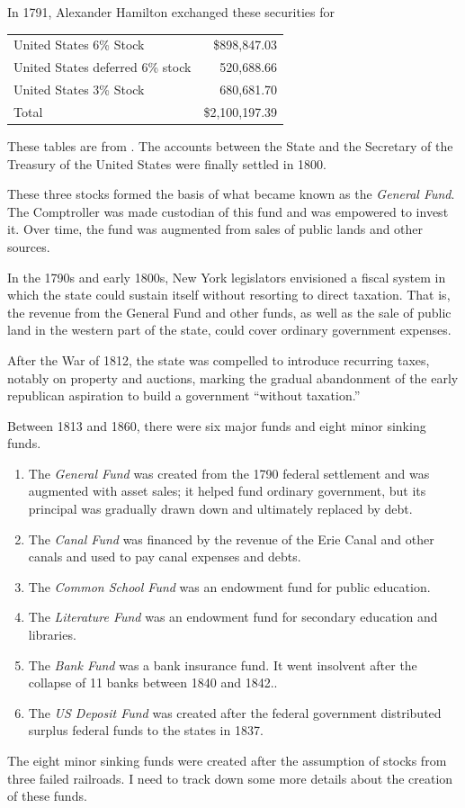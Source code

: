 \documentclass[11pt]{article}
\begin{document}
\noindent In 1791, Alexander Hamilton exchanged these securities for
\begin{center}
\begin{tabular}{lr}
United States 6\% Stock             & \$898,847.03 \\
United States deferred 6\% stock    & 520,688.66 \\
United States 3\% Stock             & 680,681.70 \\
\hline
Total                               &  \$2,100,197.39
\end{tabular}
\end{center}
These tables are from \citet[pages 255-6]{Sowers_1914}.  The accounts between 
the State and the Secretary of the Treasury of the United States were finally settled 
in 1800.  

These three stocks formed the basis of what became known as the \textit{General Fund}.  
The Comptroller was made custodian of this fund and was empowered to invest it.  
Over time, the fund was augmented from sales of public lands and other sources.  

In the 1790s and early 1800s, New York legislators envisioned a fiscal system 
in which the state could sustain itself without resorting to direct taxation.  
That is, the revenue from the General Fund and other funds, as well as the 
sale of public land in the western part of the state, could cover ordinary 
government expenses. 

After the War of 1812, the state was compelled to introduce 
recurring taxes, notably on property and auctions, marking the gradual 
abandonment of the early republican aspiration to build a government ``without 
taxation.''

Between 1813 and 1860, there were six major funds and eight minor sinking funds.  
\begin{enumerate}
\item The \textit{General Fund} was created from the 1790 federal settlement and was augmented with asset sales; it helped fund ordinary government, 
but its principal was gradually drawn down and ultimately replaced by debt. 
\item The \textit{Canal Fund} was financed by the revenue of the Erie Canal and other canals and used to pay canal expenses and debts.
\item The \textit{Common School Fund} was an endowment fund for public education. 
\item The \textit{Literature Fund} was an endowment fund for secondary education and libraries.
\item The \textit{Bank Fund} was a bank insurance fund.  It went insolvent after the collapse of 11 banks between 1840 and 1842..
\item The \textit{US Deposit Fund} was created after the federal government distributed surplus federal funds to the states in 1837. 
\end{enumerate}
The eight minor sinking funds were created after the assumption of stocks from three failed railroads. I need to track down some more details about the creation of these funds.
\end{document}

